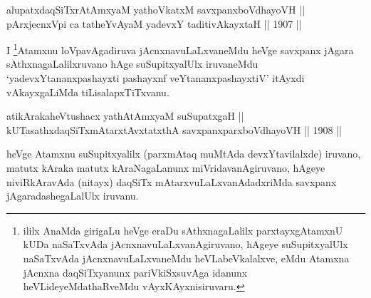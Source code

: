 
\begin{shl}
alupatxdaqSiTxrAtAmx\s yaM yathoVkatxM savxpanxboVdhayoVH || \\
pArxjecnxV\s pi ca tatheYvAyaM yadevxY taditivAkayxtaH \hfill || 1907 ||
  
\end{shl}

\begin{artha}
I \footnote{ililx AnaMda girigaLu heVge eraDu sAthxnagaLalilx
parxtayxgAtamxnU kUDa naSaTxvAda jAcnxnavuLaLxvanAgiruvano, hAgeye
suSupitxyalUlx naSaTxvAda jAcnxnavuLaLxvaneMdu heVLabeVkalalxve,
eMdu Atamxna jAcnxna daqSiTxyanunx pariVkiSxsuvAga idanunx
heVLideyeMdathaRveMdu vAyxKAyxnisiruvaru.}Atamxnu loVpavAgadiruva jAcnxnavuLaLxvaneMdu heVge
savxpanx jAgara sAthxnagaLalilxruvano hAge suSupitxyalUlx iruvaneMdu
`yadevxYtananxpashayxti pashayxnf veYtananxpashayxtiV' itAyxdi vAkayxgaLiMda tiLisalapxTiTxvanu.
\end{artha}


\begin{shl}
atikArakaheVtushacx yathA\s \s tAmx\s yaM suSupatxgaH || \\
kUTasathxdaqSiTxmAtarxtAvxtatxthA savxpanxparxboVdhayoVH \hfill || 1908 ||
  
\end{shl}

\begin{artha}
heVge Atamxnu suSupitxyalilx (parxmAtaq muMtAda devxYtavilalxde)
iruvano, matutx kAraka matutx kAraNagaLanunx miVridavanAgiruvano,
hAgeye niviRkAravAda (nitayx) daqSiTx mAtarxvuLaLxvanAdadxriMda
savxpanx jAgaradashegaLalUlx iruvanu.
\end{artha}


